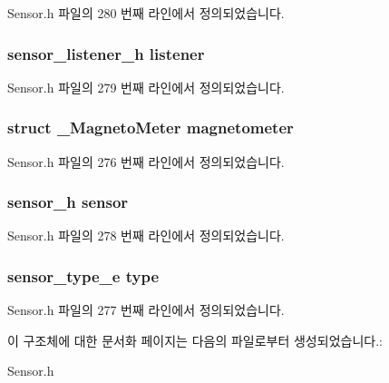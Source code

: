 Sensor.\-h 파일의 280 번째 라인에서 정의되었습니다.

\hypertarget{struct__MagnetoMeterExtend_aa977dfb866b24fd7d9a20a9a01b2fd1f}{
\subsubsection[{listener}]{\setlength{\rightskip}{0pt plus 5cm}sensor\-\_\-listener\-\_\-h listener}}\label{struct__MagnetoMeterExtend_aa977dfb866b24fd7d9a20a9a01b2fd1f}


Sensor.\-h 파일의 279 번째 라인에서 정의되었습니다.

\hypertarget{struct__MagnetoMeterExtend_a8679591114ee0c09969a82b9bd9f9fe4}{
\subsubsection[{magnetometer}]{\setlength{\rightskip}{0pt plus 5cm}struct {\bf \-\_\-\-Magneto\-Meter} magnetometer}}\label{struct__MagnetoMeterExtend_a8679591114ee0c09969a82b9bd9f9fe4}


Sensor.\-h 파일의 276 번째 라인에서 정의되었습니다.

\hypertarget{struct__MagnetoMeterExtend_a5bae9b7801bc3808411925cde81d3f26}{
\subsubsection[{sensor}]{\setlength{\rightskip}{0pt plus 5cm}sensor\-\_\-h sensor}}\label{struct__MagnetoMeterExtend_a5bae9b7801bc3808411925cde81d3f26}


Sensor.\-h 파일의 278 번째 라인에서 정의되었습니다.

\hypertarget{struct__MagnetoMeterExtend_abffb09766da2fc510a79bb51f82a36e1}{
\subsubsection[{type}]{\setlength{\rightskip}{0pt plus 5cm}sensor\-\_\-type\-\_\-e type}}\label{struct__MagnetoMeterExtend_abffb09766da2fc510a79bb51f82a36e1}


Sensor.\-h 파일의 277 번째 라인에서 정의되었습니다.



이 구조체에 대한 문서화 페이지는 다음의 파일로부터 생성되었습니다.\-:\begin{DoxyCompactItemize}
\item 
Sensor.\-h\end{DoxyCompactItemize}
